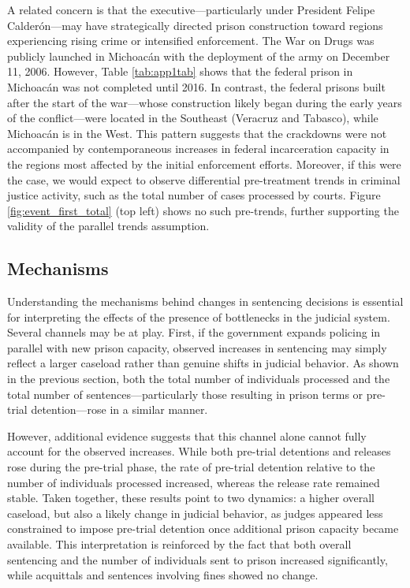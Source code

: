 A related concern is that the executive—particularly under President Felipe Calderón—may have strategically directed prison construction toward regions experiencing rising crime or intensified enforcement. The War on Drugs was publicly launched in Michoacán with the deployment of the army on December 11, 2006. However, Table \ref{tab:app1tab} shows that the federal prison in Michoacán was not completed until 2016. In contrast, the federal prisons built after the start of the war—whose construction likely began during the early years of the conflict—were located in the Southeast (Veracruz and Tabasco), while Michoacán is in the West. This pattern suggests that the crackdowns were not accompanied by contemporaneous increases in federal incarceration capacity in the regions most affected by the initial enforcement efforts. Moreover, if this were the case, we would expect to observe differential pre-treatment trends in criminal justice activity, such as the total number of cases processed by courts. Figure \ref{fig:event_first_total} (top left) shows no such pre-trends, further supporting the validity of the parallel trends assumption.

\subsection*{Mechanisms}

Understanding the mechanisms behind changes in sentencing decisions is essential for interpreting the effects of the presence of bottlenecks in the judicial system. Several channels may be at play. First, if the government expands policing in parallel with new prison capacity, observed increases in sentencing may simply reflect a larger caseload rather than genuine shifts in judicial behavior. As shown in the previous section, both the total number of individuals processed and the total number of sentences—particularly those resulting in prison terms or pre-trial detention—rose in a similar manner.

However, additional evidence suggests that this channel alone cannot fully account for the observed increases. While both pre-trial detentions and releases rose during the pre-trial phase, the rate of pre-trial detention relative to the number of individuals processed increased, whereas the release rate remained stable. Taken together, these results point to two dynamics: a higher overall caseload, but also a likely change in judicial behavior, as judges appeared less constrained to impose pre-trial detention once additional prison capacity became available. This interpretation is reinforced by the fact that both overall sentencing and the number of individuals sent to prison increased significantly, while acquittals and sentences involving fines showed no change.

